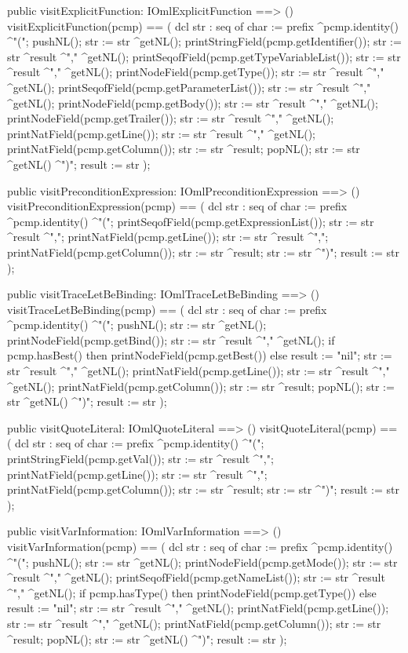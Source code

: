 \begin{vdm_al}
  public visitExplicitFunction: IOmlExplicitFunction ==> ()
  visitExplicitFunction(pcmp) ==
    ( dcl str : seq of char := prefix ^pcmp.identity() ^"(";
      pushNL();
      str := str ^getNL();
      printStringField(pcmp.getIdentifier());
      str := str ^result ^"," ^getNL();
      printSeqofField(pcmp.getTypeVariableList());
      str := str ^result ^"," ^getNL();
      printNodeField(pcmp.getType());
      str := str ^result ^"," ^getNL();
      printSeqofField(pcmp.getParameterList());
      str := str ^result ^"," ^getNL();
      printNodeField(pcmp.getBody());
      str := str ^result ^"," ^getNL();
      printNodeField(pcmp.getTrailer());
      str := str ^result ^"," ^getNL();
      printNatField(pcmp.getLine());
      str := str ^result ^"," ^getNL();
      printNatField(pcmp.getColumn());
      str := str ^result;
      popNL();
      str := str ^getNL() ^")";
      result := str );

  public visitPreconditionExpression: IOmlPreconditionExpression ==> ()
  visitPreconditionExpression(pcmp) ==
    ( dcl str : seq of char := prefix ^pcmp.identity() ^"(";
      printSeqofField(pcmp.getExpressionList());
      str := str ^result ^",";
      printNatField(pcmp.getLine());
      str := str ^result ^",";
      printNatField(pcmp.getColumn());
      str := str ^result;
      str := str ^")";
      result := str );

  public visitTraceLetBeBinding: IOmlTraceLetBeBinding ==> ()
  visitTraceLetBeBinding(pcmp) ==
    ( dcl str : seq of char := prefix ^pcmp.identity() ^"(";
      pushNL();
      str := str ^getNL();
      printNodeField(pcmp.getBind());
      str := str ^result ^"," ^getNL();
      if pcmp.hasBest()
      then printNodeField(pcmp.getBest())
      else result := "nil";
      str := str ^result ^"," ^getNL();
      printNatField(pcmp.getLine());
      str := str ^result ^"," ^getNL();
      printNatField(pcmp.getColumn());
      str := str ^result;
      popNL();
      str := str ^getNL() ^")";
      result := str );

  public visitQuoteLiteral: IOmlQuoteLiteral ==> ()
  visitQuoteLiteral(pcmp) ==
    ( dcl str : seq of char := prefix ^pcmp.identity() ^"(";
      printStringField(pcmp.getVal());
      str := str ^result ^",";
      printNatField(pcmp.getLine());
      str := str ^result ^",";
      printNatField(pcmp.getColumn());
      str := str ^result;
      str := str ^")";
      result := str );

  public visitVarInformation: IOmlVarInformation ==> ()
  visitVarInformation(pcmp) ==
    ( dcl str : seq of char := prefix ^pcmp.identity() ^"(";
      pushNL();
      str := str ^getNL();
      printNodeField(pcmp.getMode());
      str := str ^result ^"," ^getNL();
      printSeqofField(pcmp.getNameList());
      str := str ^result ^"," ^getNL();
      if pcmp.hasType()
      then printNodeField(pcmp.getType())
      else result := "nil";
      str := str ^result ^"," ^getNL();
      printNatField(pcmp.getLine());
      str := str ^result ^"," ^getNL();
      printNatField(pcmp.getColumn());
      str := str ^result;
      popNL();
      str := str ^getNL() ^")";
      result := str );


\end{vdm_al}
